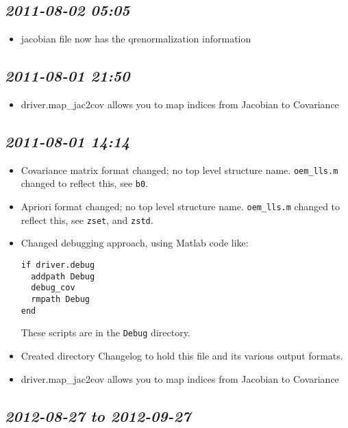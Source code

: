 \documentclass[11pt]{article}
\begin{document}
\subsection{\textit{2011-08-02 05:05}}
\label{sec-2_5}


\begin{itemize}
\item jacobian file now has the qrenormalization information
\end{itemize}
\subsection{\textit{2011-08-01 21:50}}
\label{sec-2_6}

\begin{itemize}
\item driver.map\_jac2cov allows you to map indices from Jacobian to Covariance
\end{itemize}

\subsection{\textit{2011-08-01 14:14}}
\label{sec-2_7}

\begin{itemize}
\item Covariance matrix format changed; no top level structure name.
  \texttt{oem\_lls.m} changed to reflect this, see \texttt{b0}.
\item Apriori format changed; no top level structure name.
  \texttt{oem\_lls.m} changed to reflect this, see \texttt{zset}, and \texttt{zstd}.
\item Changed debugging approach, using Matlab code like:
\begin{verbatim}
if driver.debug
  addpath Debug
  debug_cov
  rmpath Debug
end
\end{verbatim}
  These scripts are in the \texttt{Debug} directory.
\item Created directory Changelog to hold this file and its various output
  formats.
\end{itemize}

\begin{itemize}
\item driver.map\_jac2cov allows you to map indices from Jacobian to Covariance
\end{itemize}

\subsection{\textit{2012-08-27 to 2012-09-27}}
\label{sec-2_8}
\end{document}
